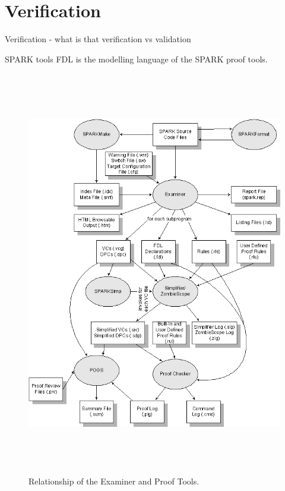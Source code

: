 
\cleardoublepage

\chapter{Verification}
\label{verification}


Verification - what is that
verification vs validation

SPARK tools
FDL is the modelling language of the SPARK proof tools. 

\begin{figure}[ht]%
    \begin{center}
    	\includegraphics[height=7in]{figures/spark-tools.png}
    	\caption{Relationship of the Examiner and Proof Tools\protect\footnotemark.}
    \end{center}
\end{figure}



